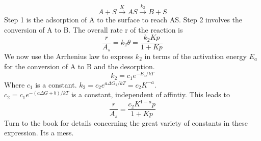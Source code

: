 \documentclass[8pt]{article}
\numberwithin{equation}{section}
\begin{document}
\begin{multicols}{2}
\begin{equation}
A+S\xrightarrow{K}AS\xrightarrow{k_{2}}B+S \tag{.}
\end{equation}
Step 1 is the adsorption of A to the surface to reach AS. Step 2 involves the conversion of A to B. The overall rate r of the reaction is 
\begin{equation}
\frac{r}{A_{s}}=k_{2}\theta=\frac{k_{2}Kp}{1+Kp} \tag{27.31}
\end{equation}
We now use the Arrhenius law to express $k_{2}$ in terms of the activation energy $E_{a}$ for the conversion of A to B and the desorption. 
\begin{equation}
k_{2}=c_{1}e^{-E_{a}/kT} \tag{27.32}
\end{equation}
Where $c_{1}$ is a constant. $k_{2}=c_{2}e^{a\Delta G_{1}/kT}=c_{2}K^{-a}$.\\ $c_{2}=c_{1}e^{-(a\Delta G+b)/kT}$ is a constant, independent of affintiy. This leads to 
\begin{equation}
\frac{r}{A_{s}}=\frac{c_{2}K^{1-a}p}{1+Kp} \tag{27.34}
\end{equation}
Turn to the book for details concerning the great variety of constants in these expression. Its a mess.
\setcounter{section}{31}

\end{multicols}
\end{document}
